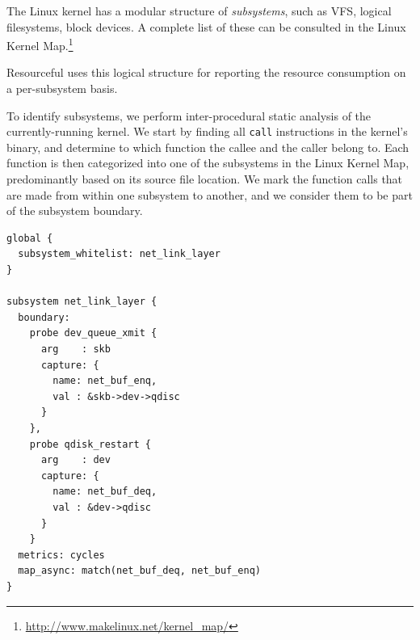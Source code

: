 \documentclass[letterpaper,twocolumn,10pt]{article}
\newcommand{\pname}{Resourceful}
\newcommand{\lnote}[1]{\textcolor{red}{[\textit{#1}]}} %
\begin{document}
The Linux kernel has a modular structure of \emph{subsystems}, such as VFS,
logical filesystems, block devices. A complete list of these can be consulted in
the Linux Kernel Map.\footnote{\url{http://www.makelinux.net/kernel_map/}}

\pname{ }uses this logical structure for reporting the resource consumption on a
per-subsystem basis. 



To identify subsystems, we perform inter-procedural static analysis of the
currently-running kernel. We start by finding all \texttt{call} instructions in
the kernel's binary, and determine to which function the callee and the caller
belong to. Each function is then categorized into one of the subsystems in the
Linux Kernel Map, predominantly based on its source file location. We mark the
function calls that are made from within one subsystem to another, and we
consider them to be part of the subsystem boundary.

\vspace{1em}
\lstset{style=customc, captionpos=b}
\begin{lstlisting}[caption={Sample configuration file defining a custom subsystem},label={lst:config}]
global {
  subsystem_whitelist: net_link_layer
}

subsystem net_link_layer {
  boundary:
    probe dev_queue_xmit {
      arg    : skb
      capture: {
        name: net_buf_enq,
        val : &skb->dev->qdisc
      }
    },
    probe qdisk_restart {
      arg    : dev
      capture: {
        name: net_buf_deq,
        val : &dev->qdisc
      }
    }
  metrics: cycles
  map_async: match(net_buf_deq, net_buf_enq)
}
\end{lstlisting}
\end{document}
